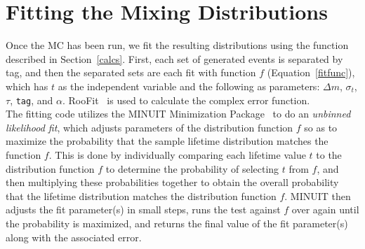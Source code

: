\documentclass[10pt]{article}
\begin{document}
%
%



\section{Fitting the Mixing Distributions}

Once the MC has been run, we fit the resulting distributions using the function
described in Section~\ref{calcs}. First, each set of generated events is separated by tag, and then 
the separated sets are each fit with function $f$ (Equation~\ref{fitfunc}),%
which has $t$ as the independent variable and the following as parameters:
$\Delta m$, $\sigma_t$, $\tau$, {\tt tag}, and $\alpha$. RooFit~\cite{roofit} is used to calculate
the complex error function.\\

\noindent The fitting code utilizes the MINUIT Minimization Package~\cite{minuit}
to do an {\it unbinned likelihood fit}, which adjusts parameters of the distribution
function $f$ so as to maximize the probability that the sample lifetime distribution
matches the function $f$.  This is done by individually comparing each lifetime
value $t$ to the distribution function $f$ to determine the probability of
selecting $t$ from $f$, and then multiplying these probabilities together to
obtain the overall probability that the lifetime distribution matches the distribution
function $f$. MINUIT then adjusts the fit parameter(s) in small steps, runs the test
against $f$ over again until the probability is maximized, and returns the final
value of the fit parameter(s) along with the associated error.\\
\end{document}
